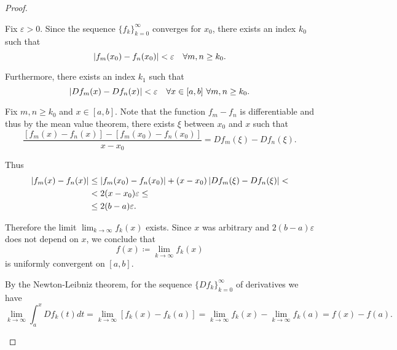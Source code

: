\begin{proof}
  \begin{description}
     Fix \( \varepsilon > 0 \). Since the sequence \( \{ f_k \}_{k=0}^\infty \) converges for \( x_0 \), there exists an index \( k_0 \) such that
    \begin{equation*}
      \left\vert f_m(x_0) - f_n(x_0) \right\vert < \varepsilon \quad\forall m, n \geq k_0.
    \end{equation*}

    Furthermore, there exists an index \( k_1 \) such that
    \begin{equation*}
      \left\vert D f_m(x) - D f_n(x) \right\vert < \varepsilon \quad\forall x \in [a, b] \ \forall m, n \geq k_0.
    \end{equation*}

    Fix \( m, n \geq k_0 \) and \( x \in [a, b] \). Note that the function \( f_m - f_n \) is differentiable and thus by the mean value theorem, there exists \( \xi \) between \( x_0 \) and \( x \) such that
    \begin{equation*}
      \frac {[f_m(x) - f_n(x)] - [f_m(x_0) - f_n(x_0)]} {x - x_0} = D f_m(\xi) - D f_n(\xi).
    \end{equation*}

    Thus
    \begin{align*}
      \left\vert f_m(x) - f_n(x) \right\vert
      &\leq
      \left\vert f_m(x_0) - f_n(x_0) \right\vert + (x - x_0)\left\vert D f_m(\xi) - D f_n(\xi) \right\vert
      < \\ &<
      2 (x - x_0) \varepsilon
      \leq \\ &\leq
      2 (b - a) \varepsilon.
    \end{align*}

    Therefore the limit \( \lim_{k\to\infty} f_k(x) \) exists. Since \( x \) was arbitrary and \( 2 (b - a) \varepsilon \) does not depend on \( x \), we conclude that
    \begin{equation*}
      f(x) \coloneqq \lim_{k\to\infty} f_k(x)
    \end{equation*}
    is uniformly convergent on \( [a, b] \).

    By the Newton-Leibniz theorem, for the sequence \( \{ D f_k \}_{k=0}^\infty \) of derivatives we have
    \begin{equation*}
      \lim_{k \to \infty} \int_a^x D f_k(t) dt
      =
      \lim_{k \to \infty} [f_k(x) - f_k(a)]
      =
      \lim_{k \to \infty} f_k(x) - \lim_{k \to \infty} f_k(a)
      =
      f(x) - f(a).
    \end{equation*}


\end{description}
\end{proof}
